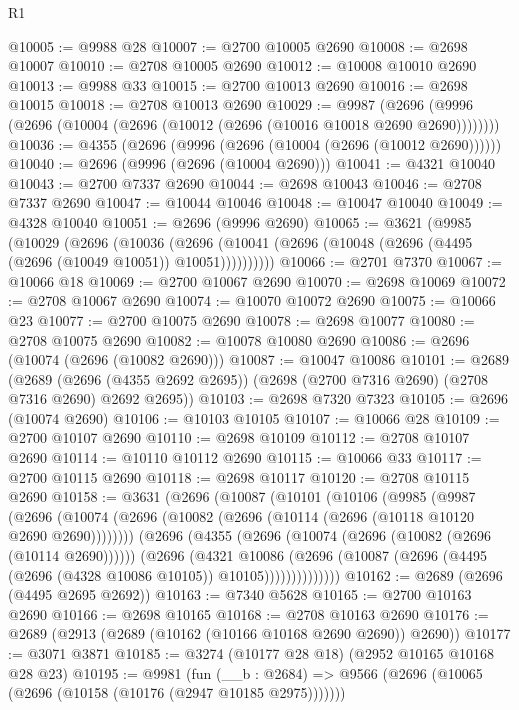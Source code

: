 \begin{lexlean}{R1}
\begin{coremodule}
@10005 := @9988 @28
@10007 := @2700 @10005 @2690
@10008 := @2698 @10007
@10010 := @2708 @10005 @2690
@10012 := @10008 @10010 @2690
@10013 := @9988 @33
@10015 := @2700 @10013 @2690
@10016 := @2698 @10015
@10018 := @2708 @10013 @2690
@10029 := @9987
    (@2696 (@9996 (@2696 (@10004 (@2696 (@10012 (@2696 (@10016 @10018 @2690 @2690))))))))
@10036 := @4355 (@2696 (@9996 (@2696 (@10004 (@2696 (@10012 @2690))))))
@10040 := @2696 (@9996 (@2696 (@10004 @2690)))
@10041 := @4321 @10040
@10043 := @2700 @7337 @2690
@10044 := @2698 @10043
@10046 := @2708 @7337 @2690
@10047 := @10044 @10046
@10048 := @10047 @10040
@10049 := @4328 @10040
@10051 := @2696 (@9996 @2690)
@10065 := @3621
    (@9985
      (@10029
        (@2696
          (@10036
            (@2696 (@10041 (@2696 (@10048 (@2696 (@4495 (@2696 (@10049 @10051)) @10051))))))))))
@10066 := @2701 @7370
@10067 := @10066 @18
@10069 := @2700 @10067 @2690
@10070 := @2698 @10069
@10072 := @2708 @10067 @2690
@10074 := @10070 @10072 @2690
@10075 := @10066 @23
@10077 := @2700 @10075 @2690
@10078 := @2698 @10077
@10080 := @2708 @10075 @2690
@10082 := @10078 @10080 @2690
@10086 := @2696 (@10074 (@2696 (@10082 @2690)))
@10087 := @10047 @10086
@10101 := @2689
    (@2689 (@2696 (@4355 @2692 @2695)) (@2698 (@2700 @7316 @2690) (@2708 @7316 @2690) @2692 @2695))
@10103 := @2698 @7320 @7323
@10105 := @2696 (@10074 @2690)
@10106 := @10103 @10105
@10107 := @10066 @28
@10109 := @2700 @10107 @2690
@10110 := @2698 @10109
@10112 := @2708 @10107 @2690
@10114 := @10110 @10112 @2690
@10115 := @10066 @33
@10117 := @2700 @10115 @2690
@10118 := @2698 @10117
@10120 := @2708 @10115 @2690
@10158 := @3631
    (@2696
      (@10087
        (@10101
          (@10106
            (@9985
              (@9987
                (@2696
                  (@10074 (@2696 (@10082 (@2696 (@10114 (@2696 (@10118 @10120 @2690 @2690))))))))
                (@2696
                  (@4355
                    (@2696 (@10074 (@2696 (@10082 (@2696 (@10114 @2690))))))
                    (@2696
                      (@4321
                        @10086
                        (@2696
                          (@10087 (@2696 (@4495 (@2696 (@4328 @10086 @10105)) @10105))))))))))))))
@10162 := @2689 (@2696 (@4495 @2695 @2692))
@10163 := @7340 @5628
@10165 := @2700 @10163 @2690
@10166 := @2698 @10165
@10168 := @2708 @10163 @2690
@10176 := @2689 (@2913 (@2689 (@10162 (@10166 @10168 @2690 @2690)) @2690))
@10177 := @3071 @3871
@10185 := @3274 (@10177 @28 @18) (@2952 @10165 @10168 @28 @23)
@10195 := @9981
    (fun (__b : @2684) => @9566 (@2696 (@10065 (@2696 (@10158 (@10176 (@2947 @10185 @2975)))))))

\end{coremodule}
\end{lexlean}
